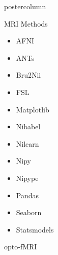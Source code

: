 \documentclass{beamer}
\begin{document}
\begin{frame}
\begin{columns}
\begin{column}{.57\textwidth}
\begin{beamercolorbox}[center]{postercolumn}
\begin{minipage}{.98\textwidth}
{\begin{myblock}{MRI Methods}
\begin{center}
\begin{minipage}{.32\textwidth}
\begin{itemize}
\begin{multicols}{3}
											\begin{itemize}
												\item AFNI
												\item ANTs
												\item Bru2Nii
												\item FSL
												\item Matplotlib
												\item Nibabel
												\item Nilearn
												\item Nipy
												\item Nipype
												\item Pandas
												\item Seaborn
												\item Statsmodels
											\end{itemize}
										\end{multicols}
								\end{itemize}
							\end{minipage}
						\end{center}
					\end{myblock}\vfill
					\begin{myblock}{opto-fMRI}
						\vspace{0.3em}
						\vspace{0.9em}
			
					\end{myblock}\vfill
		}\end{minipage}\end{beamercolorbox}
	\end{column}
\end{columns}
\end{frame}
\end{document}

